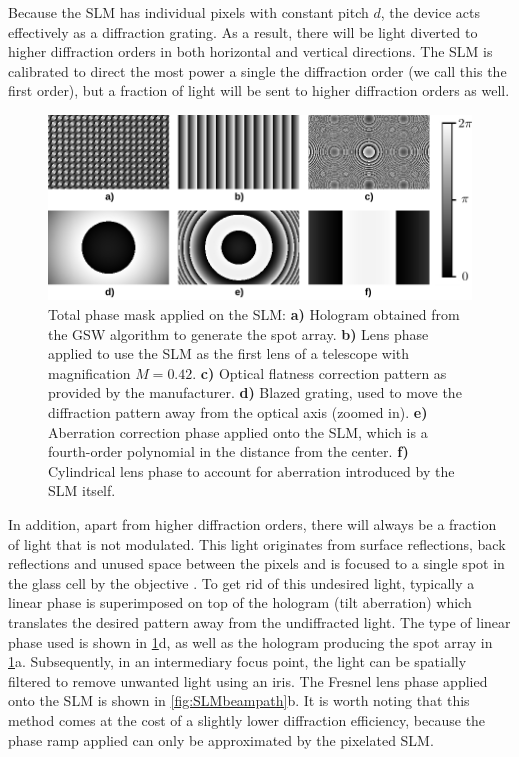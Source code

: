 Because the SLM has individual pixels with constant pitch $d$, the device acts effectively as a diffraction grating.
As a result, there will be light diverted to higher diffraction orders in both horizontal and vertical directions.
The SLM is calibrated to direct the most power a single the diffraction order (we call this the first order), but a fraction of light will be sent to higher diffraction orders as well.

\begin{figure}
	\centering
	\includegraphics[width=\textwidth]{figures/hologram.png}
	\caption{
		Total phase mask applied on the SLM: \textbf{a)} Hologram obtained from the \ac{GSW} algorithm to generate the spot array.
		\textbf{b)} Lens phase applied to use the SLM as the first lens of a telescope with magnification $M=0.42$.
		\textbf{c)} Optical flatness correction pattern as provided by the manufacturer.
		\textbf{d)} Blazed grating, used to move the diffraction pattern away from the optical axis (zoomed in).
		\textbf{e)} Aberration correction phase applied onto the SLM, which is a fourth-order polynomial in the distance from the center.
		\textbf{f)} Cylindrical lens phase to account for aberration introduced by the SLM itself.
	}
	\label{fig:SLMphase}
\end{figure}

In addition, apart from higher diffraction orders, there will always be a fraction of light that is not modulated.
This light originates from surface reflections, back reflections and unused space between the pixels and is focused to a single spot in the glass cell by the objective \cite{Bijnen2013}.
To get rid of this undesired light, typically a linear phase is superimposed on top of the hologram (tilt aberration) which translates the desired pattern away from the undiffracted light.
The type of linear phase used is shown in \cref{fig:SLMphase}d, as well as the hologram producing the spot array in \cref{fig:SLMphase}a.
Subsequently, in an intermediary focus point, the light can be spatially filtered to remove unwanted light using an iris. 
The Fresnel lens phase applied onto the SLM is shown in \cref{fig:SLMbeampath}b.
It is worth noting that this method comes at the cost of a slightly lower diffraction efficiency, because the phase ramp applied can only be approximated by the pixelated SLM.

